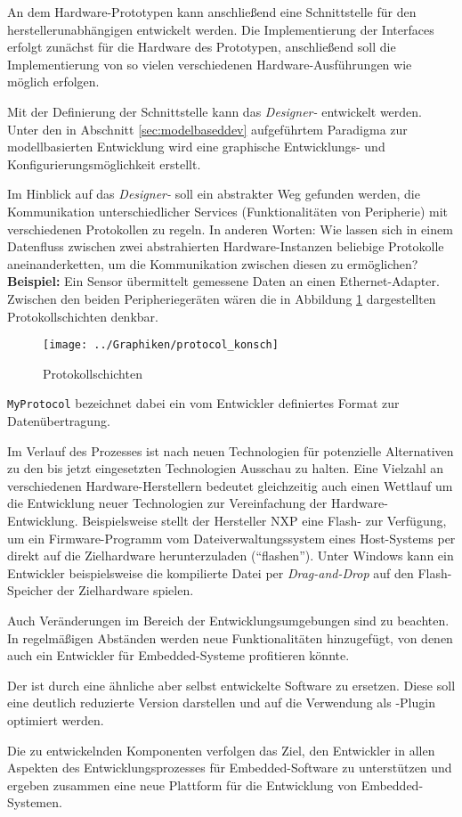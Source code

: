     An dem Hardware-Prototypen kann anschließend eine Schnittstelle für den herstellerunabhängigen
     entwickelt werden. Die Implementierung der Interfaces erfolgt zunächst für die Hardware
    des Prototypen, anschließend soll die Implementierung von so vielen verschiedenen Hardware-Ausführungen wie möglich
    erfolgen.

    Mit der Definierung der Schnittstelle kann das \textit{Designer-} entwickelt werden. Unter den in
    Abschnitt \ref{sec:modelbaseddev} aufgeführtem Paradigma zur modellbasierten Entwicklung wird eine graphische
    Entwicklungs- und Konfigurierungsmöglichkeit erstellt.

    Im Hinblick auf das \textit{Designer-} soll ein abstrakter Weg gefunden werden, die Kommunikation
    unterschiedlicher Services (Funktionalitäten von Peripherie) mit verschiedenen Protokollen zu regeln.
    In anderen Worten: Wie lassen sich in einem Datenfluss zwischen zwei abstrahierten Hardware-Instanzen beliebige
    Protokolle aneinanderketten, um die Kommunikation zwischen diesen zu ermöglichen?\\
    \textbf{Beispiel:} Ein Sensor übermittelt gemessene Daten an einen Ethernet-Adapter. Zwischen den beiden
    Peripheriegeräten wären die in Abbildung \ref{fig:protocolabstraction} dargestellten Protokollschichten denkbar.
    \begin{figure}
        \centering
        \caption{Protokollschichten}
        \label{fig:protocolabstraction}
        \texttt{[image: ../Graphiken/protocol\_konsch]}
    \end{figure}
    \texttt{MyProtocol} bezeichnet dabei ein vom Entwickler definiertes Format zur Datenübertragung.

    Im Verlauf des Prozesses ist nach neuen Technologien für potenzielle Alternativen zu den bis jetzt eingesetzten
    Technologien Ausschau zu halten. Eine Vielzahl an verschiedenen Hardware-Herstellern bedeutet gleichzeitig auch
    einen Wettlauf um die Entwicklung neuer Technologien zur Vereinfachung der Hardware-Entwicklung.
    Beispielsweise stellt der Hersteller NXP eine Flash- zur Verfügung, um ein Firmware-Programm vom
    Dateiverwaltungssystem eines Host-Systems per  direkt auf die Zielhardware herunterzuladen (``flashen''). Unter
    Windows kann ein Entwickler beispielsweise die kompilierte Datei per \textit{Drag-and-Drop} auf den Flash-Speicher
    der Zielhardware spielen.

    Auch Veränderungen im Bereich der Entwicklungsumgebungen sind zu beachten. In regelmäßigen Abständen werden neue
    Funktionalitäten hinzugefügt, von denen auch ein Entwickler für Embedded-Systeme profitieren könnte.

    Der  ist durch eine ähnliche aber selbst entwickelte Software zu ersetzen. Diese soll eine deutlich
    reduzierte Version darstellen und auf die Verwendung als -Plugin optimiert werden.

    Die zu entwickelnden Komponenten verfolgen das Ziel, den Entwickler in allen Aspekten des Entwicklungsprozesses für
    Embedded-Software zu unterstützen und ergeben zusammen eine neue Plattform für die Entwicklung von Embedded-Systemen.